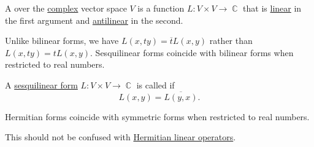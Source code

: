 \begin{definition}\label{def:sesquilinear_form}
  A  over the \hyperref[def:complex_numbers]{complex} vector space \( V \) is a function \( L: V \times V \to \BbbC \) that is \hyperref[def:semimodule/homomorphism]{linear} in the first argument and \hyperref[def:antilinear_function]{antilinear} in the second.

  Unlike bilinear forms, we have \( L(x, ty) = \overline t L(x, y) \) rather than \( L(x, ty) = t L(x, y) \). Sesquilinear forms coincide with bilinear forms when restricted to real numbers.
\end{definition}

\begin{definition}\label{def:hermitian_form}
  A \hyperref[def:sesquilinear_form]{sesquilinear form} \( L: V \times V \to \BbbC \) is called  if
  \begin{equation*}
    L(x, y) = \overline{L(y, x)}.
  \end{equation*}

  Hermitian forms coincide with symmetric forms when restricted to real numbers.

  This should not be confused with \hyperref[def:adjoint_operator]{Hermitian linear operators}.
\end{definition}

